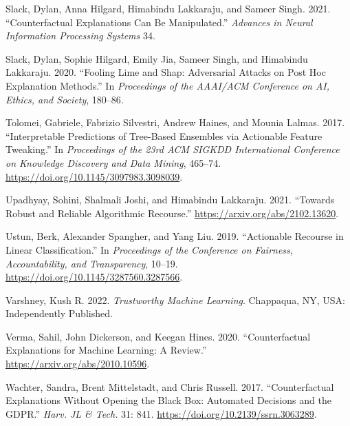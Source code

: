\documentclass{juliacon}
\newlength{\cslhangindent}
\newlength{\cslentryspacingunit} %
\newenvironment{CSLReferences}[2] %
 {%
  \setlength{\parindent}{0pt}
  \ifodd #1
  \let\oldpar\par
  \def\par{\hangindent=\cslhangindent\oldpar}
  \fi
  \setlength{\parskip}{#2\cslentryspacingunit}
 }%
 {}
\begin{document}
\begin{CSLReferences}{1}{0}
\leavevmode{}%
Slack, Dylan, Anna Hilgard, Himabindu Lakkaraju, and Sameer Singh. 2021.
{``Counterfactual Explanations Can Be Manipulated.''} \emph{Advances in
Neural Information Processing Systems} 34.

\leavevmode{}%
Slack, Dylan, Sophie Hilgard, Emily Jia, Sameer Singh, and Himabindu
Lakkaraju. 2020. {``Fooling Lime and Shap: {Adversarial} Attacks on Post
Hoc Explanation Methods.''} In \emph{Proceedings of the {AAAI}/{ACM
Conference} on {AI}, {Ethics}, and {Society}}, 180--86.

\leavevmode{}%
Tolomei, Gabriele, Fabrizio Silvestri, Andrew Haines, and Mounia Lalmas.
2017. {``Interpretable {Predictions} of {Tree}-Based {Ensembles} via
{Actionable} {Feature} {Tweaking}.''} In \emph{Proceedings of the 23rd
{ACM} {SIGKDD} {International} {Conference} on {Knowledge} {Discovery}
and {Data} {Mining}}, 465--74.
\url{https://doi.org/10.1145/3097983.3098039}.

\leavevmode{}%
Upadhyay, Sohini, Shalmali Joshi, and Himabindu Lakkaraju. 2021.
{``Towards {Robust} and {Reliable Algorithmic Recourse}.''}
\url{https://arxiv.org/abs/2102.13620}.

\leavevmode{}%
Ustun, Berk, Alexander Spangher, and Yang Liu. 2019. {``Actionable
Recourse in Linear Classification.''} In \emph{Proceedings of the
{Conference} on {Fairness}, {Accountability}, and {Transparency}},
10--19. \url{https://doi.org/10.1145/3287560.3287566}.

\leavevmode{}%
Varshney, Kush R. 2022. \emph{Trustworthy {Machine Learning}}.
{Chappaqua, NY, USA}: {Independently Published}.

\leavevmode{}%
Verma, Sahil, John Dickerson, and Keegan Hines. 2020. {``Counterfactual
Explanations for Machine Learning: {A} Review.''}
\url{https://arxiv.org/abs/2010.10596}.

\leavevmode{}%
Wachter, Sandra, Brent Mittelstadt, and Chris Russell. 2017.
{``Counterfactual Explanations Without Opening the Black Box:
{Automated} Decisions and the {GDPR}.''} \emph{Harv. JL \& Tech.} 31:
841. \url{https://doi.org/10.2139/ssrn.3063289}.


\end{CSLReferences}
\end{document}
